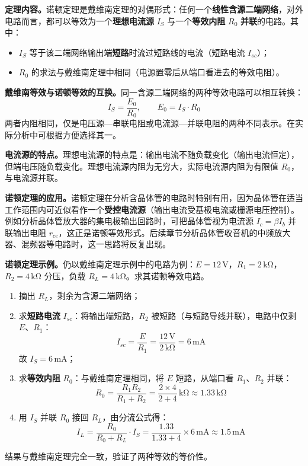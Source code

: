 \documentclass[12pt,UTF8]{ctexbook}
\begin{document}
\textbf{定理内容。}诺顿定理是戴维南定理的对偶形式：任何一个\textbf{线性含源二端网络}，对外电路而言，都可以等效为一个\textbf{理想电流源} $I_S$ 与一个\textbf{等效内阻} $R_0$ \textbf{并联}的电路。其中：
\begin{itemize}
  \item $I_S$ 等于该二端网络输出端\textbf{短路}时流过短路线的电流（短路电流 $I_{sc}$）；
  \item $R_0$ 的求法与戴维南定理中相同（电源置零后从端口看进去的等效电阻）。
\end{itemize}

\textbf{戴维南等效与诺顿等效的互换。}同一含源二端网络的两种等效电路可以相互转换：
\[
I_S = \frac{E_0}{R_0}, \qquad E_0 = I_S \cdot R_0
\]
两者内阻相同，仅是电压源—串联电阻或电流源—并联电阻的两种不同表示。在实际分析中可根据方便选择其一。

\textbf{电流源的特点。}理想电流源的特点是：输出电流不随负载变化（输出电流恒定），但端电压随负载变化。理想电流源内阻为无穷大，实际电流源内阻为有限值 $R_0$，与电流源并联。

\textbf{诺顿定理的应用。}诺顿定理在分析含晶体管的电路时特别有用，因为晶体管在适当工作范围内可近似看作一个\textbf{受控电流源}（输出电流受基极电流或栅源电压控制）。例如分析晶体管放大器的集电极输出回路时，可把晶体管视为电流源 $I_c = \beta I_b$ 并联输出电阻 $r_{ce}$，这正是诺顿等效形式。后续章节分析晶体管收音机的中频放大器、混频器等电路时，这一思路将反复出现。

\textbf{诺顿定理示例。}仍以戴维南定理示例中的电路为例：$E=12\,\mathrm{V}$，$R_1=2\,\mathrm{k\Omega}$，$R_2=4\,\mathrm{k\Omega}$ 分压，负载 $R_L=4\,\mathrm{k\Omega}$。求其诺顿等效电路。

\begin{enumerate}
  \item 摘出 $R_L$，剩余为含源二端网络；
  \item 求\textbf{短路电流} $I_{sc}$：将输出端短路，$R_2$ 被短路（与短路导线并联），电路中仅剩 $E$、$R_1$：
  \[
  I_{sc} = \frac{E}{R_1} = \frac{12\,\mathrm{V}}{2\,\mathrm{k\Omega}} = 6\,\mathrm{mA}
  \]
  故 $I_S = 6\,\mathrm{mA}$；
  \item 求\textbf{等效内阻} $R_0$：与戴维南定理相同，将 $E$ 短路，从端口看 $R_1$、$R_2$ 并联：
  \[
  R_0 = \frac{R_1 R_2}{R_1 + R_2} = \frac{2 \times 4}{2 + 4}\,\mathrm{k\Omega} \approx 1.33\,\mathrm{k\Omega}
  \]
  \item 用 $I_S$ 并联 $R_0$ 接回 $R_L$，由分流公式得：
  \[
  I_L = \frac{R_0}{R_0 + R_L} \cdot I_S = \frac{1.33}{1.33 + 4} \times 6\,\mathrm{mA} \approx 1.5\,\mathrm{mA}
  \]
\end{enumerate}
结果与戴维南定理完全一致，验证了两种等效的等价性。
\end{document}
